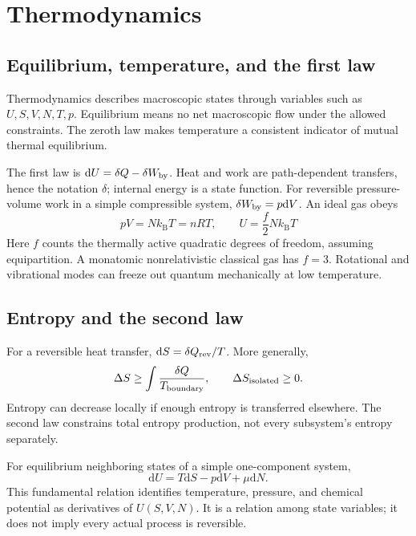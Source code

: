 \documentclass[11pt,oneside]{book}
\newcommand{\dd}{\mathrm{d}}
\newcommand{\kb}{k_{\mathrm B}}
\theoremstyle{reviewstyle}
\begin{document}
\chapter{Thermodynamics}
\section{Equilibrium, temperature, and the first law}
Thermodynamics describes macroscopic states through variables such as $U,S,V,N,T,p$. Equilibrium means no net macroscopic flow under the allowed constraints. The zeroth law makes temperature a consistent indicator of mutual thermal equilibrium.

The first law is $\dd U=\delta Q-\delta W_{\rm by}$. Heat and work are path-dependent transfers, hence the notation $\delta$; internal energy is a state function. For reversible pressure-volume work in a simple compressible system, $\delta W_{\rm by}=p\dd V$. An ideal gas obeys
\begin{equation}pV=N\kb T=nRT,\qquad U=\frac f2N\kb T\end{equation}
Here $f$ counts the thermally active quadratic degrees of freedom, assuming equipartition. A monatomic nonrelativistic classical gas has $f=3$. Rotational and vibrational modes can freeze out quantum mechanically at low temperature.
\section{Entropy and the second law}
For a reversible heat transfer, $\dd S=\delta Q_{\rm rev}/T$. More generally,
\begin{equation}\Delta S\geq\int\frac{\delta Q}{T_{\rm boundary}},\qquad \Delta S_{\rm isolated}\geq0.\end{equation}
Entropy can decrease locally if enough entropy is transferred elsewhere. The second law constrains total entropy production, not every subsystem's entropy separately.

For equilibrium neighboring states of a simple one-component system,
\begin{equation}\boxed{\dd U=T\dd S-p\dd V+\mu\dd N.}\end{equation}
This fundamental relation identifies temperature, pressure, and chemical potential as derivatives of $U(S,V,N)$. It is a relation among state variables; it does not imply every actual process is reversible.
\end{document}
